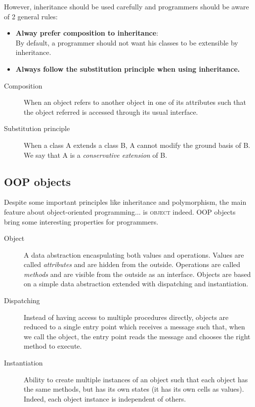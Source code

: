 \documentclass[11pt,a4paper,twoside,openright]{report}
\begin{document}
However, inheritance should be used carefully and programmers should be aware 
of 2 general rules:
\begin{itemize}
	\item \textbf{Alway prefer composition to inheritance}:\\
	By default, a programmer should not want his classes to be extensible 
by inheritance.
	\item \textbf{Always follow the substitution principle when using 
inheritance.}
\end{itemize}

\begin{description}
  \item[Composition] When an object refers to another object in one of its 
attributes such that the object referred is accessed through its usual 
interface.
  \item[Substitution principle] When a class A extends a class B, A cannot 
modify the ground basis of B. We say that A is a \textit{conservative 
extension} 
of B.
\end{description}

\subsection{OOP objects}

Despite some important principles like inheritance and polymorphism, the main 
feature about object-oriented programming... is \textsc{object} indeed. OOP 
objects bring some interesting properties for programmers.

\begin{description}
 \item[Object] A data abstraction encaspulating both values and operations. 
Values are called \textit{attributes} and are hidden from the outside. 
Operations are called \textit{methods} and are visible from the outside as an 
interface. Objects are based on a simple data abstraction extended with 
dispatching and instantiation.
 \item[Dispatching] Instead of having access to multiple procedures directly, 
objects are reduced to a single entry point which receives a message such that, 
when we call the object, the entry point reads the message and chooses the 
right 
method to execute.
 \item[Instantiation] Ability to create multiple instances of an object such 
that each object has the same methods, but has its own states (it has its own 
cells as values). Indeed, each object instance is independent of others.
\end{description}
\end{document}
